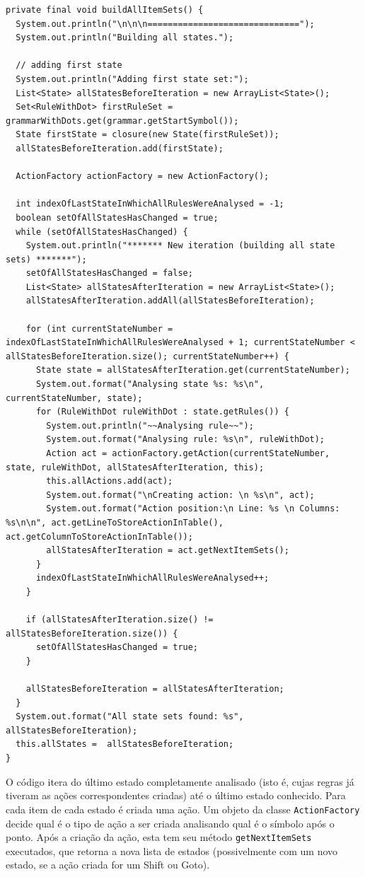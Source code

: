 \documentclass[11pt]{article}
\begin{document}
\begin{verbatim}
private final void buildAllItemSets() {
  System.out.println("\n\n\n==============================");
  System.out.println("Building all states.");

  // adding first state
  System.out.println("Adding first state set:");
  List<State> allStatesBeforeIteration = new ArrayList<State>();
  Set<RuleWithDot> firstRuleSet = grammarWithDots.get(grammar.getStartSymbol());
  State firstState = closure(new State(firstRuleSet));
  allStatesBeforeIteration.add(firstState);

  ActionFactory actionFactory = new ActionFactory();

  int indexOfLastStateInWhichAllRulesWereAnalysed = -1;
  boolean setOfAllStatesHasChanged = true;
  while (setOfAllStatesHasChanged) {
    System.out.println("******* New iteration (building all state sets) *******");
    setOfAllStatesHasChanged = false;
    List<State> allStatesAfterIteration = new ArrayList<State>();
    allStatesAfterIteration.addAll(allStatesBeforeIteration);

    for (int currentStateNumber = indexOfLastStateInWhichAllRulesWereAnalysed + 1; currentStateNumber < allStatesBeforeIteration.size(); currentStateNumber++) {
      State state = allStatesAfterIteration.get(currentStateNumber);
      System.out.format("Analysing state %s: %s\n", currentStateNumber, state);
      for (RuleWithDot ruleWithDot : state.getRules()) {
        System.out.println("~~Analysing rule~~");
        System.out.format("Analysing rule: %s\n", ruleWithDot);
        Action act = actionFactory.getAction(currentStateNumber, state, ruleWithDot, allStatesAfterIteration, this);
        this.allActions.add(act);
        System.out.format("\nCreating action: \n %s\n", act);
        System.out.format("Action position:\n Line: %s \n Columns: %s\n\n", act.getLineToStoreActionInTable(), act.getColumnToStoreActionInTable());
        allStatesAfterIteration = act.getNextItemSets();
      }
      indexOfLastStateInWhichAllRulesWereAnalysed++;
    }

    if (allStatesAfterIteration.size() != allStatesBeforeIteration.size()) {
      setOfAllStatesHasChanged = true;
    }

    allStatesBeforeIteration = allStatesAfterIteration;
  }
  System.out.format("All state sets found: %s", allStatesBeforeIteration);
  this.allStates =  allStatesBeforeIteration;
}
\end{verbatim}

O código itera do último estado completamente analisado (isto é, cujas
regras já tiveram as ações correspondentes criadas) até o último estado conhecido.
Para cada item de cada estado é criada uma ação. Um objeto da classe
\texttt{ActionFactory} decide qual é o tipo de ação a ser criada analisando qual é o
símbolo após o ponto. Após a criação da ação, esta tem seu método
\texttt{getNextItemSets} executados, que retorna a nova lista de estados (possivelmente com
um novo estado, se a ação criada for um Shift ou Goto).
\end{document}
